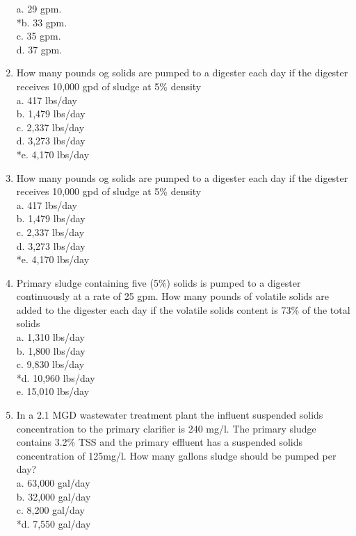 \documentclass{article}
\begin{document}
\begin{enumerate}
a. 29 gpm. \\
*b. 33 gpm. \\
c. 35 gpm. \\
d. 37 gpm. \\

\item  How many pounds og solids are pumped to a digester each day if the digester receives 10,000 gpd of sludge at 5\% density \\

a. 417 lbs/day \\
b. 1,479 lbs/day \\
c. 2,337 lbs/day \\
d. 3,273 lbs/day \\
*e. 4,170 lbs/day \\

\item  How many pounds og solids are pumped to a digester each day if the digester receives 10,000 gpd of sludge at 5\% density \\

a. 417 lbs/day \\
b. 1,479 lbs/day \\
c. 2,337 lbs/day \\
d. 3,273 lbs/day \\
*e. 4,170 lbs/day \\

\item  Primary sludge containing five (5\%) solids is pumped to a digester continuously at a rate of 25 gpm.  How many pounds of volatile solids are added to the digester each day if the volatile solids content is 73\% of the total solids \\

a. 1,310 lbs/day \\
b. 1,800 lbs/day \\
c. 9,830 lbs/day \\
*d. 10,960 lbs/day \\
e. 15,010 lbs/day \\

\item  In a 2.1 MGD wastewater treatment plant the influent suspended solids concentration to the primary clarifier is 240 mg/l.  The primary sludge contains 3.2\% TSS and the primary effluent has a suspended solids concentration of 125mg/l.  How many gallons sludge should be pumped per day? \\

a. 63,000 gal/day \\
b. 32,000 gal/day \\
c. 8,200 gal/day \\
*d. 7,550 gal/day \\


\end{enumerate}
\end{document}
